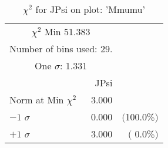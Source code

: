  \begin{table}[h!]\centering
 {\small{
 \begin{tabular}{||l||r||r||}
 \hline
 \hline
\multicolumn{2}{||c||}{$\chi^{2}$ Min  51.383} & \\
 \multicolumn{2}{||c||}{Number of bins used:   29.} & \\
\multicolumn{2}{||c||}{One $\sigma$:    1.331} & \\
 \hline
 \hline
    & JPsi & \\
Norm at Min $\chi^{2}$  &   3.000 & \\
$-1$ $\sigma$ &   0.000  &  $($100.0$\%)$  \\
$+1$ $\sigma$ &   3.000  &  $($  0.0$\%)$  \\
 \hline
 \hline
 \end{tabular}
 \caption{$\chi^{2}$ for JPsi on plot: 'Mmumu'}
 \label{tab-chijpsi}
 }}
 \end{table}
 \endinput
